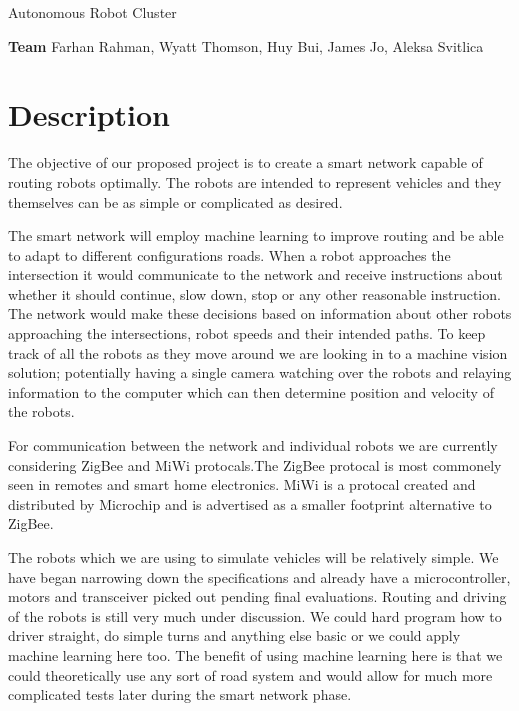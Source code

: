 \documentclass[a4paper]{article}
\begin{document}
	\begin{center}
		\huge Autonomous Robot Cluster
	\end{center}
	\textbf{Team} Farhan Rahman, Wyatt Thomson, Huy Bui, James Jo, Aleksa Svitlica \\

	\section*{Description}
		\par 
		The objective of our proposed project is to create a smart network capable of routing robots optimally. The robots are intended to represent vehicles and they themselves can be as simple or complicated as desired. \par
		The smart network will employ machine learning to improve routing and be able to adapt to different configurations roads. When a robot approaches the intersection it would communicate to the network and receive instructions about whether it should continue, slow down, stop or any other reasonable instruction. The network would make these decisions based on information about other robots approaching the intersections, robot speeds and their intended paths. To keep track of all the robots as they move around we are looking in to a machine vision solution; potentially having a single camera watching over the robots and relaying information to the computer which can then determine position and velocity of the robots. \par
		For communication between the network and individual robots we are currently considering ZigBee and MiWi protocals.The ZigBee protocal is most commonely seen in remotes and smart home electronics. MiWi is a protocal created and distributed by Microchip and is advertised as a smaller footprint alternative to ZigBee. \par
		The robots which we are using to simulate vehicles will be relatively simple. We have began narrowing down the specifications and already have a microcontroller, motors and transceiver picked out pending final evaluations. Routing and driving of the robots is still very much under discussion. We could hard program how to driver straight, do simple turns and anything else basic or we could apply machine learning here too. The benefit of using machine learning here is that we could theoretically use any sort of road system and would allow for much more complicated tests later during the smart network phase. \\  
		 
\end{document}
